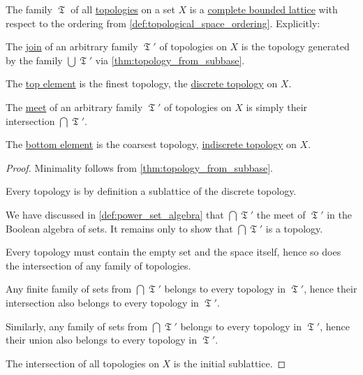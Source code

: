 \begin{proposition}\label{thm:lattice_of_topologies}
  The family \( \mfrakT \) of all \hyperref[def:topological_space]{topologies} on a set \( X \) is a \hyperref[def:lattice]{complete bounded lattice} with respect to the ordering from \cref{def:topological_space_ordering}. Explicitly:

  \begin{thmenum}
     The \hyperref[def:lattice]{join} of an arbitrary family \( \mfrakT' \) of topologies on \( X \) is the topology generated by the family \( \bigcup \mfrakT' \) via \cref{thm:topology_from_subbase}.

     The \hyperref[def:extremal_points/top_and_bottom]{top element} is the finest topology, the \hyperref[def:discrete_topology]{discrete topology} on \( X \).

     The \hyperref[def:lattice]{meet} of an arbitrary family \( \mfrakT' \) of topologies on \( X \) is simply their intersection \( \bigcap \mfrakT' \).

     The \hyperref[def:extremal_points/top_and_bottom]{bottom element} is the coarsest topology, \hyperref[def:indiscrete_topology]{indiscrete topology} on \( X \).
  \end{thmenum}
\end{proposition}
\begin{proof}
   Minimality follows from \cref{thm:topology_from_subbase}.

   Every topology is by definition a sublattice of the discrete topology.

   We have discussed in \cref{def:power_set_algebra} that \( \bigcap \mfrakT' \) the meet of \( \mfrakT' \) in the Boolean algebra of sets. It remains only to show that \( \bigcap \mfrakT' \) is a topology.

   Every topology must contain the empty set and the space itself, hence so does the intersection of any family of topologies.

   Any finite family of sets from \( \bigcap \mfrakT' \) belongs to every topology in \( \mfrakT' \), hence their intersection also belongs to every topology in \( \mfrakT' \).

   Similarly, any family of sets from \( \bigcap \mfrakT' \) belongs to every topology in \( \mfrakT' \), hence their union also belongs to every topology in \( \mfrakT' \).

   The intersection of all topologies on \( X \) is the initial sublattice.
\end{proof}

